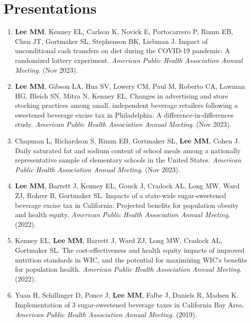 \documentclass{cv_style}
\begin{document}
\section{Presentations}
\begin{enumerate}[leftmargin = 2em]
    \item \textbf{Lee MM}, Kenney EL, Carlson K, Novick E, Portocarrero P, Rimm EB, Chen JT, Gortmaker SL, Stephenson BK, Liebman J. Impact of unconditional cash transfers on diet during the COVID-19 pandemic: A randomized lottery experiment. \textit{American Public Health Association Annual Meeting}. (Nov 2023). 
    \item \parskip 1pt \textbf{Lee MM}, Gibson LA, Hua SV, Lowery CM, Paul M, Roberto CA, Lawman HG, Bleich SN, Mitra N, Kenney EL. Changes in advertising and store stocking practices among small, independent beverage retailers following a sweetened beverage excise tax in Philadelphia: A difference-in-differences study. \textit{American Public Health Association Annual Meeting}. (Nov 2023).  
    \item \parskip 1pt Chapman L, Richardson S, Rimm EB, Gortmaker SL, \textbf{Lee MM}, Cohen J. Daily saturated fat and sodium content of school meals among a nationally representative sample of elementary schools in the United States. \textit{American Public Health Association Annual Meeting}. (Nov 2023). 
    \item \parskip 1pt \textbf{Lee MM}, Barrett J, Kenney EL, Gouck J, Cradock AL, Long MW, Ward ZJ, Rohrer B, Gortmaker SL. Impacts of a state-wide sugar-sweetened beverage excise tax in California: Projected benefits for population obesity and health equity. \textit{American Public Health Association Annual Meeting}. (2022).
    \item \parskip 1pt Kenney EL, \textbf{Lee MM}, Barrett J, Ward ZJ, Long MW, Cradock AL, Gortmaker SL. The cost-effectiveness and health equity impacts of improved nutrition standards in WIC, and the potential for maximizing WIC’s benefits for population health. \textit{American Public Health Association Annual Meeting}. (2022).
    \item \parskip 1pt Yuan H, Schillinger D, Ponce J, \textbf{Lee MM},  Falbe J, Daniels R, Madsen K. Implementation of 3 sugar-sweetened beverage taxes in California Bay Area. \textit{American Public Health Association Annual Meeting}. (2019).
\end{enumerate}




\end{document}
